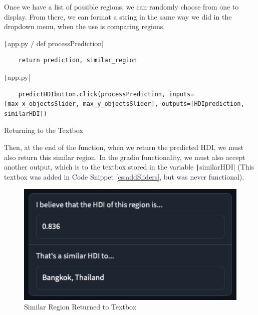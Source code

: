 \documentclass[12pt]{report}
\newcommand{\pil}[1]{\protect\texttt|#1|}
\begin{document}
Once we have a list of possible regions, we can randomly choose from one to display. From there, we can format a string in the same way we did in the dropdown menu, when the use is comparing regions.

\begin{center}
\end{center}

\begin{listing}[H]
\pil{app.py / def processPrediction}
\begin{verbatim}
    return prediction, similar_region
\end{verbatim}
\pil{app.py}
\begin{verbatim}
    predictHDIbutton.click(processPrediction, inputs=[max_x_objectsSlider, max_y_objectsSlider], outputs=[HDIprediction, similarHDI])
\end{verbatim}
\caption{Returning to the Textbox}\label{cs:returnToTextbox}
\end{listing}

Then, at the end of the function, when we return the predicted HDI, we must also return this similar region. In the gradio functionality, we must also accept another output, which is to the textbox stored in the variable \pil{similarHDI} (This textbox was added in Code Snippet \ref{cs:addSliders}, but was never functional).

\begin{figure}[H]
\centering
\includegraphics[width=12cm]{ss19.1.png}
\caption{Similar Region Returned to Textbox}\label{fig:ss19.1}
\end{figure}
\end{document}
